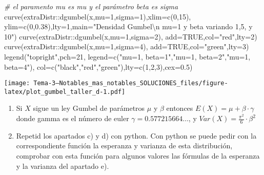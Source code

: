 \documentclass[
]{article}
\newenvironment{Shaded}{\begin{snugshade}}{\end{snugshade}}
\newcommand{\AttributeTok}[1]{\textcolor[rgb]{0.77,0.63,0.00}{#1}}
\newcommand{\CommentTok}[1]{\textcolor[rgb]{0.56,0.35,0.01}{\textit{#1}}}
\newcommand{\ConstantTok}[1]{\textcolor[rgb]{0.00,0.00,0.00}{#1}}
\newcommand{\DecValTok}[1]{\textcolor[rgb]{0.00,0.00,0.81}{#1}}
\newcommand{\FloatTok}[1]{\textcolor[rgb]{0.00,0.00,0.81}{#1}}
\newcommand{\FunctionTok}[1]{\textcolor[rgb]{0.00,0.00,0.00}{#1}}
\newcommand{\NormalTok}[1]{#1}
\newcommand{\SpecialCharTok}[1]{\textcolor[rgb]{0.00,0.00,0.00}{#1}}
\newcommand{\StringTok}[1]{\textcolor[rgb]{0.31,0.60,0.02}{#1}}
\begin{document}
\begin{Shaded}
\begin{Highlighting}[]
\CommentTok{\# el paramento mu es mu y el parámetro beta es sigma}
\FunctionTok{curve}\NormalTok{(extraDistr}\SpecialCharTok{::}\FunctionTok{dgumbel}\NormalTok{(x,}\AttributeTok{mu=}\DecValTok{1}\NormalTok{,}\AttributeTok{sigma=}\DecValTok{1}\NormalTok{),}\AttributeTok{xlim=}\FunctionTok{c}\NormalTok{(}\DecValTok{0}\NormalTok{,}\DecValTok{15}\NormalTok{),}
      \AttributeTok{ylim=}\FunctionTok{c}\NormalTok{(}\DecValTok{0}\NormalTok{,}\FloatTok{0.38}\NormalTok{),}\AttributeTok{lty=}\DecValTok{1}\NormalTok{,}\AttributeTok{main=}\StringTok{"Densidad  Gumbel}\SpecialCharTok{\textbackslash{}n}\StringTok{ mu=1 y beta variando 1,5, y 10"}\NormalTok{)}
\FunctionTok{curve}\NormalTok{(extraDistr}\SpecialCharTok{::}\FunctionTok{dgumbel}\NormalTok{(x,}\AttributeTok{mu=}\DecValTok{1}\NormalTok{,}\AttributeTok{sigma=}\DecValTok{2}\NormalTok{),}
      \AttributeTok{add=}\ConstantTok{TRUE}\NormalTok{,}\AttributeTok{col=}\StringTok{"red"}\NormalTok{,}\AttributeTok{lty=}\DecValTok{2}\NormalTok{)}
\FunctionTok{curve}\NormalTok{(extraDistr}\SpecialCharTok{::}\FunctionTok{dgumbel}\NormalTok{(x,}\AttributeTok{mu=}\DecValTok{1}\NormalTok{,}\AttributeTok{sigma=}\DecValTok{4}\NormalTok{),}
      \AttributeTok{add=}\ConstantTok{TRUE}\NormalTok{,}\AttributeTok{col=}\StringTok{"green"}\NormalTok{,}\AttributeTok{lty=}\DecValTok{3}\NormalTok{)}
\FunctionTok{legend}\NormalTok{(}\StringTok{"topright"}\NormalTok{,}\AttributeTok{pch=}\DecValTok{21}\NormalTok{,}
       \AttributeTok{legend=}\FunctionTok{c}\NormalTok{(}\StringTok{"mu=1, beta=1"}\NormalTok{,}\StringTok{"mu=1, beta=2"}\NormalTok{,}\StringTok{"mu=1, beta=4"}\NormalTok{),}
       \AttributeTok{col=}\FunctionTok{c}\NormalTok{(}\StringTok{"black"}\NormalTok{,}\StringTok{"red"}\NormalTok{,}\StringTok{"green"}\NormalTok{),}\AttributeTok{lty=}\FunctionTok{c}\NormalTok{(}\DecValTok{1}\NormalTok{,}\DecValTok{2}\NormalTok{,}\DecValTok{3}\NormalTok{),}\AttributeTok{cex=}\FloatTok{0.5}\NormalTok{)}
\end{Highlighting}
\end{Shaded}

\texttt{[image: Tema-3---Notables\_mas\_notables\_SOLUCIONES\_files/figure-latex/plot\_gumbel\_taller\_d-1.pdf]}

\begin{enumerate}
\def\labelenumi{\alph{enumi})}
\setcounter{enumi}{4}
\item
  Si \(X\) sigue un ley Gumbel de parámetros \(\mu\) y \(\beta\)
  entonces \(E(X)=\mu+\beta\cdot\gamma\) donde gamma es el número de
  euler \(\gamma=0.577215664\ldots\), y
  \(Var(X)=\frac{\pi^2}{6}\cdot \beta^2\)
\item
  Repetid los apartados c) y d) con python. Con python se puede pedir
  con la correspondiente función la esperanza y varianza de esta
  distribución, comprobar con esta función para algunos valores las
  fórmulas de la esperanza y la varianza del apartado e).
\end{enumerate}
\end{document}
